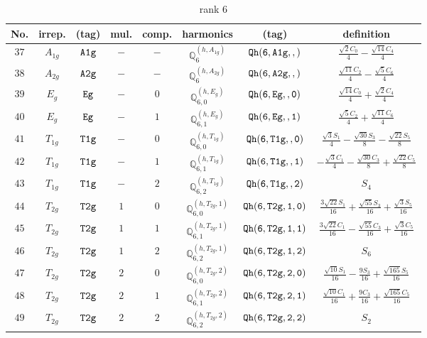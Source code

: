 \documentclass[fleqn,8pt]{jsarticle}
\begin{document}
\begin{table}[ht!]
\begin{center}
\caption{rank 6}
\renewcommand{\arraystretch}{1.3}
\begin{tabular}{cccccccc} \hline \hline
No. & irrep. & (tag) & mul. & comp. & harmonics & (tag) & definition \\ \hline
$ 37 $ & $ A_{1g} $ & $ {\tt A1g} $ & $ - $ & $ - $ & $ \mathbb{Q}_{6}^{(h,A_{1g})} $ & $ {\tt Qh(6,A1g,,)} $ & $ \frac{\sqrt{2} C_{0}}{4} - \frac{\sqrt{14} C_{4}}{4} $ \\
$ 38 $ & $ A_{2g} $ & $ {\tt A2g} $ & $ - $ & $ - $ & $ \mathbb{Q}_{6}^{(h,A_{2g})} $ & $ {\tt Qh(6,A2g,,)} $ & $ \frac{\sqrt{11} C_{2}}{4} - \frac{\sqrt{5} C_{6}}{4} $ \\
$ 39 $ & $ E_{g} $ & $ {\tt Eg} $ & $ - $ & $ 0 $ & $ \mathbb{Q}_{6,0}^{(h,E_{g})} $ & $ {\tt Qh(6,Eg,,0)} $ & $ \frac{\sqrt{14} C_{0}}{4} + \frac{\sqrt{2} C_{4}}{4} $ \\
$ 40 $ & $ E_{g} $ & $ {\tt Eg} $ & $ - $ & $ 1 $ & $ \mathbb{Q}_{6,1}^{(h,E_{g})} $ & $ {\tt Qh(6,Eg,,1)} $ & $ \frac{\sqrt{5} C_{2}}{4} + \frac{\sqrt{11} C_{6}}{4} $ \\
$ 41 $ & $ T_{1g} $ & $ {\tt T1g} $ & $ - $ & $ 0 $ & $ \mathbb{Q}_{6,0}^{(h,T_{1g})} $ & $ {\tt Qh(6,T1g,,0)} $ & $ \frac{\sqrt{3} S_{1}}{4} - \frac{\sqrt{30} S_{3}}{8} - \frac{\sqrt{22} S_{5}}{8} $ \\
$ 42 $ & $ T_{1g} $ & $ {\tt T1g} $ & $ - $ & $ 1 $ & $ \mathbb{Q}_{6,1}^{(h,T_{1g})} $ & $ {\tt Qh(6,T1g,,1)} $ & $ - \frac{\sqrt{3} C_{1}}{4} - \frac{\sqrt{30} C_{3}}{8} + \frac{\sqrt{22} C_{5}}{8} $ \\
$ 43 $ & $ T_{1g} $ & $ {\tt T1g} $ & $ - $ & $ 2 $ & $ \mathbb{Q}_{6,2}^{(h,T_{1g})} $ & $ {\tt Qh(6,T1g,,2)} $ & $ S_{4} $ \\
$ 44 $ & $ T_{2g} $ & $ {\tt T2g} $ & $ 1 $ & $ 0 $ & $ \mathbb{Q}_{6,0}^{(h,T_{2g},1)} $ & $ {\tt Qh(6,T2g,1,0)} $ & $ \frac{3 \sqrt{22} S_{1}}{16} + \frac{\sqrt{55} S_{3}}{16} + \frac{\sqrt{3} S_{5}}{16} $ \\
$ 45 $ & $ T_{2g} $ & $ {\tt T2g} $ & $ 1 $ & $ 1 $ & $ \mathbb{Q}_{6,1}^{(h,T_{2g},1)} $ & $ {\tt Qh(6,T2g,1,1)} $ & $ \frac{3 \sqrt{22} C_{1}}{16} - \frac{\sqrt{55} C_{3}}{16} + \frac{\sqrt{3} C_{5}}{16} $ \\
$ 46 $ & $ T_{2g} $ & $ {\tt T2g} $ & $ 1 $ & $ 2 $ & $ \mathbb{Q}_{6,2}^{(h,T_{2g},1)} $ & $ {\tt Qh(6,T2g,1,2)} $ & $ S_{6} $ \\
$ 47 $ & $ T_{2g} $ & $ {\tt T2g} $ & $ 2 $ & $ 0 $ & $ \mathbb{Q}_{6,0}^{(h,T_{2g},2)} $ & $ {\tt Qh(6,T2g,2,0)} $ & $ \frac{\sqrt{10} S_{1}}{16} - \frac{9 S_{3}}{16} + \frac{\sqrt{165} S_{5}}{16} $ \\
$ 48 $ & $ T_{2g} $ & $ {\tt T2g} $ & $ 2 $ & $ 1 $ & $ \mathbb{Q}_{6,1}^{(h,T_{2g},2)} $ & $ {\tt Qh(6,T2g,2,1)} $ & $ \frac{\sqrt{10} C_{1}}{16} + \frac{9 C_{3}}{16} + \frac{\sqrt{165} C_{5}}{16} $ \\
$ 49 $ & $ T_{2g} $ & $ {\tt T2g} $ & $ 2 $ & $ 2 $ & $ \mathbb{Q}_{6,2}^{(h,T_{2g},2)} $ & $ {\tt Qh(6,T2g,2,2)} $ & $ S_{2} $ \\
 \hline \hline
\end{tabular}
\end{center}
\end{table}
\end{document}
